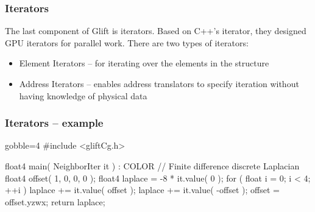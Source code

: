 \documentclass[xcolor={usenames,dvipsnames}]{beamer}
\begin{document}
\begin{frame}
  \frametitle{Iterators}

  The last component of Glift is iterators. Based on C++'s iterator, they
  designed GPU iterators for parallel work. There are two types of iterators:
  \begin{itemize}
  \item<2-> Element Iterators -- for iterating over the elements in the
    structure
  \item<3-> Address Iterators -- enables address translators to specify
    iteration without having knowledge of physical data
  \end{itemize}
\end{frame}

\begin{frame}[fragile, t]
  \frametitle{Iterators -- example}
  \begin{ccode*}{gobble=4}
    #include <gliftCg.h>

    float4 main( NeighborIter it ) : COLOR
    {
      // Finite difference discrete Laplacian
      float4 offset( 1, 0, 0, 0 );
      float4 laplace = -8 * it.value( 0 );
      for ( float i = 0; i < 4; ++i ) {
        laplace += it.value( offset );
        laplace += it.value( -offset );
        offset = offset.yzwx;
      }
      return laplace;
    }

  \end{ccode*}
\end{frame}
\end{document}
